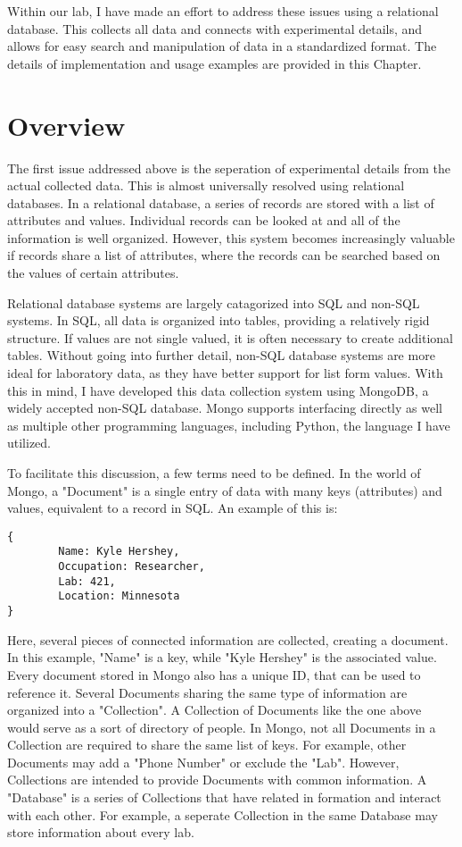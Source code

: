 \documentclass[../thesis.tex]{subfiles}
\begin{document}
Within our lab, I have made an effort to address these issues using a relational database.
This collects all data and connects with experimental details, and allows for easy search and manipulation of data in a standardized format.
The details of implementation and usage examples are provided in this Chapter.

\section{Overview}

The first issue addressed above is the seperation of experimental details from the actual collected data.  
This is almost universally resolved using relational databases.
In a relational database, a series of records are stored with a list of attributes and values.
Individual records can be looked at and all of the information is well organized.
However, this system becomes increasingly valuable if records share a list of attributes, where the records can be searched based on the values of certain attributes.

Relational database systems are largely catagorized into SQL and non-SQL systems.
In SQL, all data is organized into tables, providing a relatively rigid structure.
If values are not single valued, it is often necessary to create additional tables.
Without going into further detail, non-SQL database systems are more ideal for laboratory data, as they have better support for list form values.
With this in mind, I have developed this data collection system using MongoDB, a widely accepted non-SQL database.
Mongo supports interfacing directly as well as multiple other programming languages, including Python, the language I have utilized.

To facilitate this discussion, a few terms need to be defined.  
In the world of Mongo, a "Document" is a single entry of data with many keys (attributes) and values, equivalent to a record in SQL.
An example of this is:

\begin{lstlisting}
{
        Name: Kyle Hershey,
        Occupation: Researcher,
        Lab: 421,
        Location: Minnesota
}
\end{lstlisting}

Here, several pieces of connected information are collected, creating a document.
In this example, "Name" is a key, while "Kyle Hershey" is the associated value.
Every document stored in Mongo also has a unique ID, that can be used to reference it.
Several Documents sharing the same type of information are organized into a "Collection".
A Collection of Documents like the one above would serve as a sort of directory of people.
In Mongo, not all Documents in a Collection are required to share the same list of keys.  
For example, other Documents may add a "Phone Number" or exclude the "Lab".
However, Collections are intended to provide Documents with common information.
A "Database" is a series of Collections that have related in formation and interact with each other.
For example, a seperate Collection in the same Database may store information about every lab.
\end{document}
